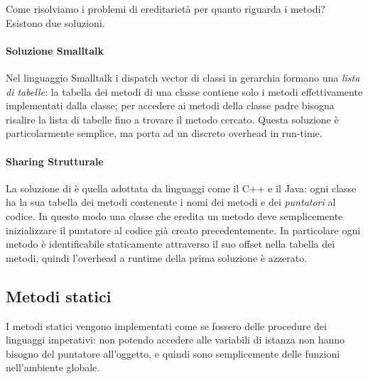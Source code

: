 Come risolviamo i problemi di ereditarietà per quanto riguarda i metodi? Esistono due soluzioni.

\paragraph{Soluzione Smalltalk} Nel linguaggio Smalltalk i dispatch vector di classi in gerarchia formano una \emph{lista di tabelle}: la tabella dei metodi di una classe contiene solo i metodi effettivamente implementati dalla classe; per accedere ai metodi della classe padre bisogna risalire la lista di tabelle fino a trovare il metodo cercato. Questa soluzione è particolarmente semplice, ma porta ad un discreto overhead in run-time.

\paragraph{Sharing Strutturale} La soluzione di  è quella adottata da linguaggi come il C++ e il Java: ogni classe ha la sua tabella dei metodi contenente i nomi dei metodi e dei \emph{puntatori} al codice. In questo modo una classe che eredita un metodo deve semplicemente inizializzare il puntatore al codice già creato precedentemente. In particolare ogni metodo è identificabile staticamente attraverso il suo offset nella tabella dei metodi, quindi l'overhead a runtime della prima soluzione è azzerato.

\subsection*{Metodi statici}

I metodi statici vengono implementati come se fossero delle procedure dei linguaggi imperativi: non potendo accedere alle variabili di istanza non hanno bisogno del puntatore  all'oggetto, e quindi sono semplicemente delle funzioni nell'ambiente globale.



